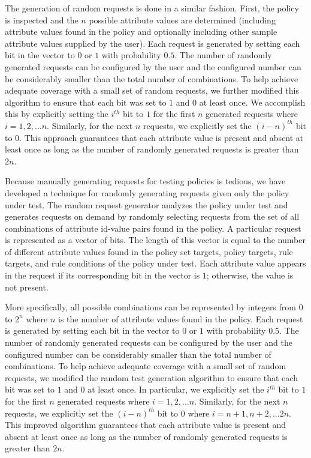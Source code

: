 {The generation of random requests is done in a similar fashion.
First, the policy is inspected and the $n$ possible attribute values
are determined (including attribute values found in the policy and
optionally including other sample attribute values supplied by the
user). Each request is generated by setting each bit in the vector
to $0$ or $1$ with probability $0.5$. The number of randomly
generated requests can be configured by the user and the configured
number can be considerably smaller than the total number of
combinations. To help achieve adequate coverage with a small set of
random requests, we further modified this algorithm to ensure that
each bit was set to $1$ and $0$ at least once. We accomplish this by
explicitly setting the $i^{th}$ bit to $1$ for the first $n$
generated requests where $i=1,2,...n$. Similarly, for the next $n$
requests, we explicitly set the $(i-n)^{th}$ bit to $0$. This
approach guarantees that each attribute value is present and absent
at least once as long as the number of randomly generated requests
is greater than $2n$.}

Because manually generating requests for testing policies is
tedious, we have developed a technique for randomly generating
requests given only the policy under test. The random request
generator analyzes the policy under test and generates requests on
demand by randomly selecting requests from the set of all
combinations of attribute id-value pairs found in the policy. A
particular request is represented as a vector of bits. The length of
this vector is equal to the number of different attribute values
found in the policy set targets, policy targets, rule targets, and
rule conditions of the policy under test. Each attribute value
appears in the request if its corresponding bit in the vector is
$1$; otherwise, the value is not present.

More specifically, all possible combinations can be represented by
integers from $0$ to $2^n$ where $n$ is the number of attribute
values found in the policy. Each request is generated by setting
each bit in the vector to $0$ or $1$ with probability $0.5$. The
number of randomly generated requests can be configured by the user
and the configured number can be considerably smaller than the total
number of combinations. To help achieve adequate coverage with a
small set of random requests, we modified the random test generation
algorithm to ensure that each bit was set to $1$ and $0$ at least
once. In particular, we explicitly set the $i^{th}$ bit to $1$ for
the first $n$ generated requests where $i=1,2,...n$. Similarly, for
the next $n$ requests, we explicitly set the $(i-n)^{th}$ bit to $0$
where $i=n+1,n+2,...2n$. This improved algorithm guarantees that
each attribute value is present and absent at least once as long as
the number of randomly generated requests is greater than $2n$.

